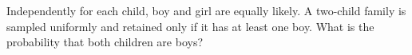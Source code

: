 Independently for each child, boy and girl are equally likely. A two-child family is sampled uniformly and retained only if it has at least one boy. What is the probability that both children are boys?

